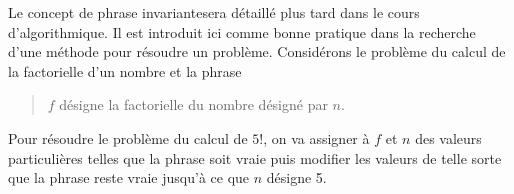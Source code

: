 Le concept de \og phrase invariante\fg sera détaillé plus tard dans le cours d'algorithmique. Il est introduit ici comme bonne pratique dans la recherche d'une méthode pour résoudre un problème.\newline
Considérons le problème du calcul de la factorielle d'un nombre et la phrase
\begin{quote}
  \og $f$ désigne la factorielle du nombre désigné par $n$.\fg
\end{quote}
Pour résoudre le problème du calcul de $5!$, on va assigner à $f$ et $n$ des valeurs particulières telles que la phrase soit vraie puis modifier les valeurs de telle sorte que la phrase reste vraie jusqu'à ce que $n$ désigne 5.

